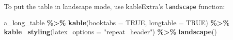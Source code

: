 \documentclass[a4paper, twoside]{templates/ociamthesis}
\newenvironment{Shaded}{\begin{snugshade}}{\end{snugshade}}
\newcommand{\DataTypeTok}[1]{\textcolor[rgb]{0.13,0.29,0.53}{#1}}
\newcommand{\KeywordTok}[1]{\textcolor[rgb]{0.13,0.29,0.53}{\textbf{#1}}}
\newcommand{\NormalTok}[1]{#1}
\newcommand{\OperatorTok}[1]{\textcolor[rgb]{0.81,0.36,0.00}{\textbf{#1}}}
\newcommand{\OtherTok}[1]{\textcolor[rgb]{0.56,0.35,0.01}{#1}}
\newcommand{\StringTok}[1]{\textcolor[rgb]{0.31,0.60,0.02}{#1}}
\renewenvironment{Shaded}
{
  \vspace{10pt}%
  \begin{snugshade}%
}{%
  \end{snugshade}%
  \vspace{8pt}%
}
\theoremstyle{definition}
\theoremstyle{definition}
\theoremstyle{definition}
\theoremstyle{definition}
\theoremstyle{remark}
\begin{document}
To put the table in landscape mode, use kableExtra's \texttt{landscape} function:

\begin{Shaded}
\begin{Highlighting}[]
\NormalTok{a\_long\_table }\OperatorTok{\%\textgreater{}\%}\StringTok{ }
\StringTok{  }\KeywordTok{kable}\NormalTok{(}\DataTypeTok{booktabs =} \OtherTok{TRUE}\NormalTok{, }\DataTypeTok{longtable =} \OtherTok{TRUE}\NormalTok{) }\OperatorTok{\%\textgreater{}\%}\StringTok{ }
\StringTok{  }\KeywordTok{kable\_styling}\NormalTok{(}\DataTypeTok{latex\_options =} \StringTok{"repeat\_header"}\NormalTok{) }\OperatorTok{\%\textgreater{}\%}\StringTok{ }
\StringTok{  }\KeywordTok{landscape}\NormalTok{()}
\end{Highlighting}
\end{Shaded}
\end{document}
